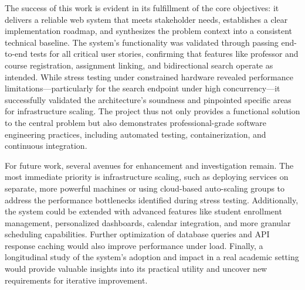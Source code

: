 \documentclass[12pt,a4paper]{article}
\begin{document}
The success of this work is evident in its fulfillment of the core objectives: it delivers a reliable web system that meets stakeholder needs, establishes a clear implementation roadmap, and synthesizes the problem context into a consistent technical baseline. The system's functionality was validated through passing end-to-end tests for all critical user stories, confirming that features like professor and course registration, assignment linking, and bidirectional search operate as intended. While stress testing under constrained hardware revealed performance limitations—particularly for the search endpoint under high concurrency—it successfully validated the architecture's soundness and pinpointed specific areas for infrastructure scaling. The project thus not only provides a functional solution to the central problem but also demonstrates professional-grade software engineering practices, including automated testing, containerization, and continuous integration.

For future work, several avenues for enhancement and investigation remain. The most immediate priority is infrastructure scaling, such as deploying services on separate, more powerful machines or using cloud-based auto-scaling groups to address the performance bottlenecks identified during stress testing. Additionally, the system could be extended with advanced features like student enrollment management, personalized dashboards, calendar integration, and more granular scheduling capabilities. Further optimization of database queries and API response caching would also improve performance under load. Finally, a longitudinal study of the system's adoption and impact in a real academic setting would provide valuable insights into its practical utility and uncover new requirements for iterative improvement.
\end{document}
